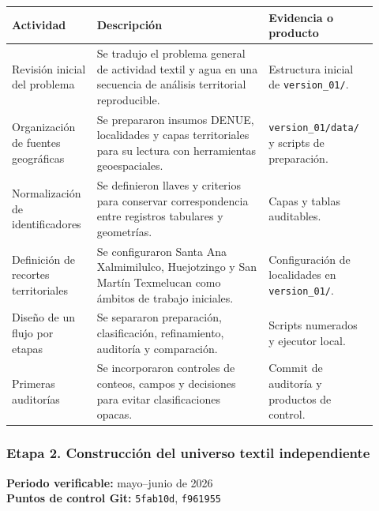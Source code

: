 \documentclass[
  spanish,
]{article}
\newcounter{none} %
\begin{document}
{\def\LTcaptype{none} %
\begin{longtable}[]{@{}p{0.20\linewidth}p{0.44\linewidth}p{0.28\linewidth}@{}}
\toprule\noalign{}
Actividad & Descripción & Evidencia o producto \\
\midrule\noalign{}
\endhead
\bottomrule\noalign{}
\endlastfoot
Revisión inicial del problema & Se tradujo el problema general de
actividad textil y agua en una secuencia de análisis territorial
reproducible. & Estructura inicial de \texttt{version\_01/}. \\
Organización de fuentes geográficas & Se prepararon insumos DENUE,
localidades y capas territoriales para su lectura con herramientas
geoespaciales. & \texttt{version\_01/data/} y scripts de preparación. \\
Normalización de identificadores & Se definieron llaves y criterios para
conservar correspondencia entre registros tabulares y geometrías. &
Capas y tablas auditables. \\
Definición de recortes territoriales & Se configuraron Santa Ana
Xalmimilulco, Huejotzingo y San Martín Texmelucan como ámbitos de
trabajo iniciales. & Configuración de localidades en
\texttt{version\_01/}. \\
Diseño de un flujo por etapas & Se separaron preparación, clasificación,
refinamiento, auditoría y comparación. & Scripts numerados y ejecutor
local. \\
Primeras auditorías & Se incorporaron controles de conteos, campos y
decisiones para evitar clasificaciones opacas. & Commit de auditoría y
productos de control. \\
\end{longtable}
}

\subsubsection{Etapa 2. Construcción del universo textil
independiente}\label{etapa-2-construcciuxf3n-del-universo-textil-independiente}

\textbf{Periodo verificable:} mayo--junio de 2026\\
\textbf{Puntos de control Git:} \texttt{5fab10d}, \texttt{f961955}
\end{document}
